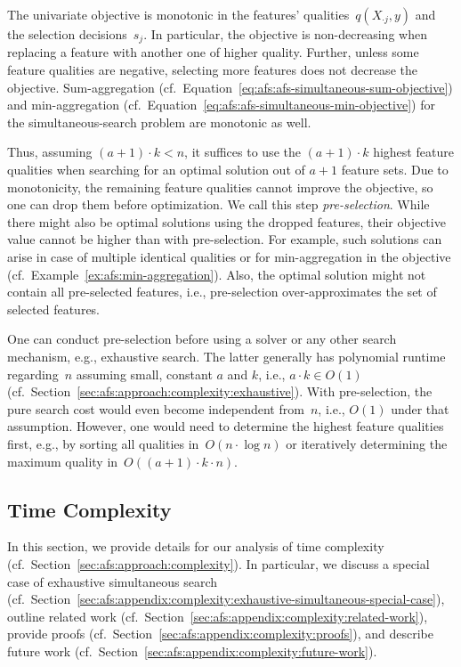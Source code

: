 \documentclass{article}
\theoremstyle{definition}
\begin{document}
The univariate objective is monotonic in the features' qualities~$q(X_{\cdot{}j},y)$ and the selection decisions~$s_j$.
In particular, the objective is non-decreasing when replacing a feature with another one of higher quality.
Further, unless some feature qualities are negative, selecting more features does not decrease the objective.
Sum-aggregation (cf.~Equation~\ref{eq:afs:afs-simultaneous-sum-objective}) and min-aggregation (cf.~Equation~\ref{eq:afs:afs-simultaneous-min-objective}) for the simultaneous-search problem are monotonic as well.

Thus, assuming $(a + 1) \cdot k < n$, it suffices to use the $(a + 1) \cdot k$ highest feature qualities when searching for an optimal solution out of $a + 1$ feature sets.
Due to monotonicity, the remaining feature qualities cannot improve the objective, so one can drop them before optimization.
We call this step \emph{pre-selection}.
While there might also be optimal solutions using the dropped features, their objective value cannot be higher than with pre-selection.
For example, such solutions can arise in case of multiple identical qualities or for min-aggregation in the objective (cf.~Example~\ref{ex:afs:min-aggregation}).
Also, the optimal solution might not contain all pre-selected features, i.e., pre-selection over-approximates the set of selected features.

One can conduct pre-selection before using a solver or any other search mechanism, e.g., exhaustive search.
The latter generally has polynomial runtime regarding~$n$ assuming small, constant $a$ and $k$, i.e., $a \cdot k \in O(1)$ (cf.~Section~\ref{sec:afs:approach:complexity:exhaustive}).
With pre-selection, the pure search cost would even become independent from~$n$, i.e., $O(1)$ under that assumption.
However, one would need to determine the highest feature qualities first, e.g., by sorting all qualities in~$O(n \cdot \log n)$ or iteratively determining the maximum quality in~$O((a+1) \cdot k \cdot n)$.

\subsection{Time Complexity}
\label{sec:afs:appendix:complexity}

In this section, we provide details for our analysis of time complexity (cf.~Section~\ref{sec:afs:approach:complexity}).
In particular, we discuss a special case of exhaustive simultaneous search (cf.~Section~\ref{sec:afs:appendix:complexity:exhaustive-simultaneous-special-case}), outline related work (cf.~Section~\ref{sec:afs:appendix:complexity:related-work}), provide proofs (cf.~Section~\ref{sec:afs:appendix:complexity:proofs}), and describe future work (cf.~Section~\ref{sec:afs:appendix:complexity:future-work}).
\end{document}
